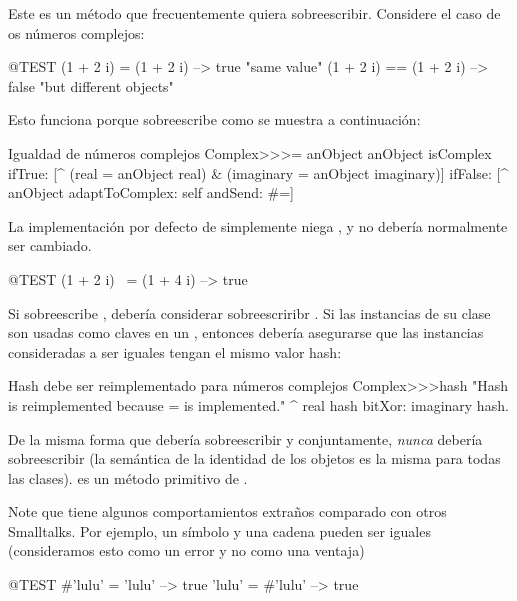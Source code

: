 \documentclass[a4paper,10pt,twoside]{book}
\begin{document}
Este es un m\'etodo que frecuentemente quiera sobreescribir. Considere el caso de os n\'umeros complejos:

\begin{code}{@TEST}
(1 + 2 i) = (1 + 2 i)   --> true     "same value"
(1 + 2 i) == (1 + 2 i) --> false    "but different objects"
\end{code}

Esto funciona porque  sobreescribe \ct{=} como se muestra a continuaci\'on:
\begin{method}{Igualdad de n\'umeros complejos}
Complex>>>= anObject
    anObject isComplex
        ifTrue: [^ (real = anObject real) & (imaginary = anObject imaginary)]
        ifFalse: [^ anObject adaptToComplex: self andSend: #=]
\end{method}

La implementaci\'on por defecto de  simplemente niega , y no deber\'ia normalmente ser cambiado.

\begin{code}{@TEST}
(1 + 2 i) ~= (1 + 4 i) --> true
\end{code}

Si sobreescribe \ct{=}, deber\'ia considerar sobreescriribr . Si las instancias de su clase son usadas como claves en un , entonces deber\'ia asegurarse que las instancias consideradas a ser iguales tengan el mismo valor hash:
\begin{method}{Hash debe ser reimplementado para n\'umeros complejos}
Complex>>>hash
    "Hash is reimplemented because = is implemented."
    ^ real hash bitXor: imaginary hash.
\end{method}

De la misma forma que deber\'ia sobreescribir \ct{=} y  conjuntamente,  \emph{nunca} deber\'ia sobreescribir \ct{==} (la sem\'antica de la identidad de los objetos es la misma para todas las clases).  \ct{==} es un m\'etodo primitivo de .

Note que \pharo tiene algunos comportamientos extraños comparado con otros Smalltalks. Por ejemplo, un s\'imbolo y una cadena pueden ser iguales (consideramos esto como un error y no como una ventaja)

\begin{code}{@TEST}
#'lulu' = 'lulu' --> true
'lulu' = #'lulu' --> true
\end{code}
\end{document}
